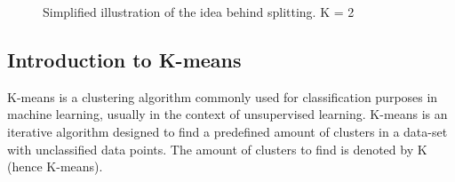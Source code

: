 \begin{figure}
	\centering
		\qquad
		\qquad

		\qquad
		\qquad
		\caption{Simplified illustration of the idea behind splitting. K = 2}%
		\label{fig:splitting}%
\end{figure}



\subsection{Introduction to K-means}
K-means is a clustering algorithm commonly used for classification purposes in machine learning, usually in the context of unsupervised learning. K-means
is an iterative algorithm designed to find a predefined amount of clusters in a data-set with unclassified data points. The amount of clusters to find is denoted by
K (hence K-means). 

